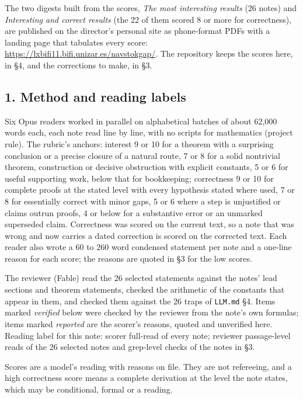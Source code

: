 \documentclass[11pt,a4paper]{article}
\begin{document}
The two digests built from the scores, \emph{The most interesting
results} (26 notes) and \emph{Interesting and correct results} (the 22
of them scored 8 or more for correctness), are published on the
director's personal site as phone-format PDFs with a landing page that
tabulates every score:
\url{https://lxbifi11.bifi.unizar.es/navstokgap/}. The repository keeps
the scores here, in §4, and the corrections to make, in §3.

\hypertarget{method-and-reading-labels}{%
\subsection{1. Method and reading
labels}\label{method-and-reading-labels}}

Six Opus readers worked in parallel on alphabetical batches of about
62,000 words each, each note read line by line, with no scripts for
mathematics (project rule). The rubric's anchors: interest 9 or 10 for a
theorem with a surprising conclusion or a precise closure of a natural
route, 7 or 8 for a solid nontrivial theorem, construction or decisive
obstruction with explicit constants, 5 or 6 for useful supporting work,
below that for bookkeeping; correctness 9 or 10 for complete proofs at
the stated level with every hypothesis stated where used, 7 or 8 for
essentially correct with minor gaps, 5 or 6 where a step is unjustified
or claims outrun proofs, 4 or below for a substantive error or an
unmarked superseded claim. Correctness was scored on the current text,
so a note that was wrong and now carries a dated correction is scored on
the corrected text. Each reader also wrote a 60 to 260 word condensed
statement per note and a one-line reason for each score; the reasons are
quoted in §3 for the low scores.

The reviewer (Fable) read the 26 selected statements against the notes'
lead sections and theorem statements, checked the arithmetic of the
constants that appear in them, and checked them against the 26 traps of
\texttt{LLM.md} §4. Items marked \emph{verified} below were checked by
the reviewer from the note's own formulas; items marked \emph{reported}
are the scorer's reasons, quoted and unverified here. Reading label for
this note: scorer full-read of every note; reviewer passage-level reads
of the 26 selected notes and grep-level checks of the notes in §3.

Scores are a model's reading with reasons on file. They are not
refereeing, and a high correctness score means a complete derivation at
the level the note states, which may be conditional, formal or a
reading.
\end{document}
